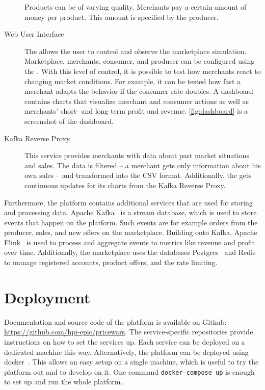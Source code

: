 \begin{description}
		Products can be of varying quality.
		Merchants pay a certain amount of money per product.
		This amount is specified by the producer.
	\item [Web User Interface]
		The \ui allows the user to control and observe the marketplace simulation.
		Marketplace, merchants, consumer, and producer can be configured using the \ui.
		With this level of control, it is possible to test how merchants react to changing market conditions.
		For example, it can be tested how fast a merchant adapts the behavior if the consumer rate doubles.
		A dashboard contains charts that visualize merchant and consumer actions as well as merchants' short- and long-term profit and revenue.
		\cref{fig:dashboard} is a screenshot of the dashboard.
	\item [Kafka Reverse Proxy]
		This service provides merchants with data about past market situations and sales.
		The data is filtered -- a merchant gets only information about his own sales -- and transformed into the CSV format.
		Additionally, the \ui gets continuous updates for its charts from the Kafka Reverse Proxy.
		
\end{description}

Furthermore, the \pricewars platform contains additional services that are used for storing and processing data.
Apache Kafka~\cite{garg2013apache} is a stream database, which is used to store events that happen on the platform. Such events are for example orders from the producer, sales, and new offers on the marketplace.
Building onto Kafka, Apache Flink~\cite{carbone2015apache} is used to process and aggregate events to metrics like revenue and profit over time.
Additionally, the marketplace uses the databases Postgres~\cite{postgres} and Redis~\cite{carlson2013redis} to manage registered accounts, product offers, and the rate limiting.

\section{Deployment}
Documentation and source code of the \pricewars platform is available on Github: \url{https://github.com/hpi-epic/pricewars}.
The service-specific repositories provide instructions on how to set the services up.
Each service can be deployed on a dedicated machine this way.
Alternatively, the \pricewars platform can be deployed using docker~\cite{Merkel:2014:DLL:2600239.2600241}.
This allows an easy setup on a single machine, which is useful to try the platform out and to develop on it.
One command \texttt{docker-compose up} is enough to set up and run the whole \pricewars platform.
